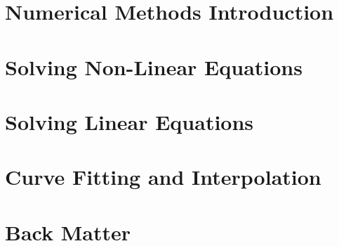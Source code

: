 \documentclass{tufte-book}
\theoremstyle{break}
\begin{document}
\part{Numerical Methods Introduction}




\part{Solving Non-Linear Equations}







\part{Solving Linear Equations}










\part{Curve Fitting and Interpolation}




\part{Back Matter}
\backmatter





\appendix
\appendixpage
\noappendicestocpagenum
\addappheadtotoc
\end{document}
